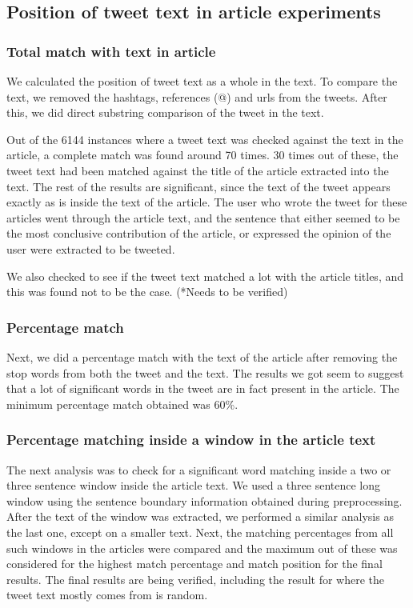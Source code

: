 \documentclass[11pt]{article}
\begin{document}
\subsection{Position of tweet text in article experiments}
\subsubsection {Total match with text in article}

We calculated the position of tweet text as a whole in the text. To compare the text, we removed the hashtags, references (@) and urls from the tweets. After this, we did direct substring comparison of the tweet in the text. 

Out of the 6144 instances where a tweet text was checked against the text in the article, a complete match was found around 70 times. 30 times out of these, the tweet text had been matched against the title of the article extracted into the text. The rest of the results are significant, since the text of the tweet appears exactly as is inside the text of the article. The user who wrote the tweet for these articles went through the article text, and the sentence that either seemed to be the most conclusive contribution of the article, or expressed the opinion of the user were extracted to be tweeted. 

We also checked to see if the tweet text matched a lot with the article titles, and this was found not to be the case. (*Needs to be verified)

\subsubsection{Percentage match}

Next, we did a percentage match with the text of the article after removing the stop words from both the tweet and the text. The results we got seem to suggest that a lot of significant words in the tweet are in fact present in the article. The minimum percentage match obtained was 60\%.

\subsubsection{Percentage matching inside a window in the article text}

The next analysis was to check for a significant word matching inside a two or three sentence window inside the article text. We used a three sentence long window using the sentence boundary information obtained during preprocessing. After the text of the window was extracted, we performed a similar analysis as the last one, except on a smaller text. Next, the matching percentages from all such windows in the articles were compared and the maximum out of these was considered for the highest match percentage and match position for the final results. The final results are being verified, including the result for where the tweet text mostly comes from is random.
\end{document}
